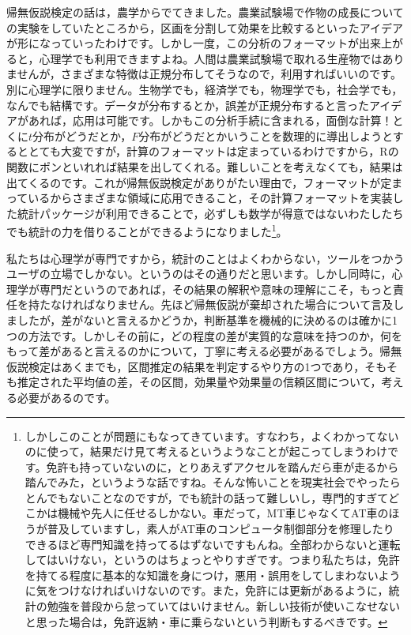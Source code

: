 \documentclass{ltjbook}
\begin{document}
帰無仮説検定の話は，農学からでてきました。農業試験場で作物の成長についての実験をしていたところから，区画を分割して効果を比較するといったアイデアが形になっていったわけです。しかし一度，この分析のフォーマットが出来上がると，心理学でも利用できますよね。人間は農業試験場で取れる生産物ではありませんが，さまざまな特徴は正規分布してそうなので，利用すればいいのです。別に心理学に限りません。生物学でも，経済学でも，物理学でも，社会学でも，なんでも結構です。データが分布するとか，誤差が正規分布すると言ったアイデアがあれば，応用は可能です。しかもこの分析手続に含まれる，面倒な計算！とくに$t$分布がどうだとか，$F$分布がどうだとかいうことを数理的に導出しようとするととても大変ですが，計算のフォーマットは定まっているわけですから，Rの関数にポンといれれば結果を出してくれる。難しいことを考えなくても，結果は出てくるのです。これが帰無仮説検定がありがたい理由で，フォーマットが定まっているからさまざまな領域に応用できること，その計算フォーマットを実装した統計パッケージが利用できることで，必ずしも数学が得意ではないわたしたちでも統計の力を借りることができるようになりました\footnote{しかしこのことが問題にもなってきています。すなわち，よくわかってないのに使って，結果だけ見て考えるというようなことが起こってしまうわけです。免許も持っていないのに，とりあえずアクセルを踏んだら車が走るから踏んでみた，というような話ですね。そんな怖いことを現実社会でやったらとんでもないことなのですが，でも統計の話って難しいし，専門的すぎてどこかは機械や先人に任せるしかない。車だって，MT車じゃなくてAT車のほうが普及していますし，素人がAT車のコンピュータ制御部分を修理したりできるほど専門知識を持ってるはずないですもんね。全部わからないと運転してはいけない，というのはちょっとやりすぎです。つまり私たちは，免許を持てる程度に基本的な知識を身につけ，悪用・誤用をしてしまわないように気をつけなければいけないのです。また，免許には更新があるように，統計の勉強を普段から怠っていてはいけません。新しい技術が使いこなせないと思った場合は，免許返納・車に乗らないという判断もするべきです。}。

私たちは心理学が専門ですから，統計のことはよくわからない，ツールをつかうユーザの立場でしかない。というのはその通りだと思います。しかし同時に，心理学が専門だというのであれば，その結果の解釈や意味の理解にこそ，もっと責任を持たなければなりません。先ほど帰無仮説が棄却された場合について言及しましたが，差がないと言えるかどうか，判断基準を機械的に決めるのは確かに1つの方法です。しかしその前に，どの程度の差が実質的な意味を持つのか，何をもって差があると言えるのかについて，丁寧に考える必要があるでしょう。帰無仮説検定はあくまでも，区間推定の結果を判定するやり方の1つであり，そもそも推定された平均値の差，その区間，効果量や効果量の信頼区間について，考える必要があるのです。
\end{document}
